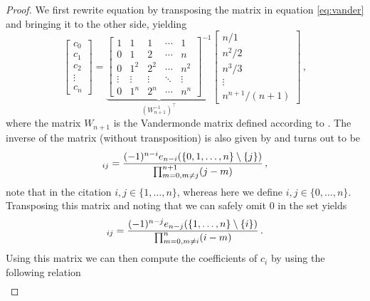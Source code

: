 \begin{proof}
We first rewrite equation by transposing the matrix in equation \ref{eq:vander} and bringing it to the other side, yielding
\begin{equation}
    \begin{bmatrix}
        c_0 \\
        c_1 \\
        c_2 \\
        \vdots \\
        c_n
    \end{bmatrix}
    =
    \underbrace{\begin{bmatrix}
        1&1&1&\cdots&1 \\
        0&1&2&\cdots&n \\
        0&1^2&2^2&\cdots&n^2 \\
        \vdots&\vdots & \vdots & \ddots & \vdots\\
        0&1^n&2^n&\cdots&n^n
    \end{bmatrix}^{-1}}_{(W_{n+1}^{-1})^\top}
    \begin{bmatrix}
        n/1\\
        n^2/2\\
        n^3/3\\
        \vdots \\
        n^{n+1}/(n+1)
    \end{bmatrix} \,, \nonumber
\end{equation}
where the matrix $W_{n+1}$ is the Vandermonde matrix defined according to \citeauthor{stirling_vandermonde} \cite{stirling_vandermonde}.
The inverse of the matrix (without transposition) is also given by \citeauthor{stirling_vandermonde} and turns out to be
\begin{equation}
    [W_{n+1}^{-1}]_{ij} = \frac{(-1)^{n-i} e_{n-i} (\{ 0, 1, \dots, n \} \setminusD \{ j \})}{\prod^{n+1}_{m=0, m\neq j} (j - m)} \,, \nonumber
\end{equation}
note that in the citation $i,j \in \{ 1, \dots, n \}$, whereas here we define $i,j \in \{ 0, \dots, n \}$.
Transposing this matrix and noting that we can safely omit $0$ in the set yields
\begin{equation}
    [(W_{n+1}^{-1})^\top]_{ij} = \frac{(-1)^{n-j} e_{n-j} (\{ 1, \dots, n \} \setminusD \{ i \})}{\prod^{n}_{m=0, m\neq i} (i - m)} \,. \nonumber
\end{equation}
Using this matrix we can then compute the coefficients of $c_i$ by using the following relation
\begin{align}

\end{align}
\end{proof}
